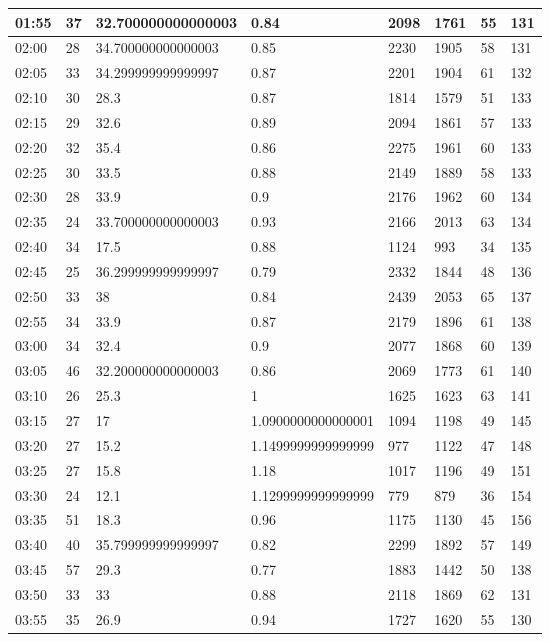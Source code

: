 \documentclass[
]{book}
\begin{document}
\begin{tabular}{l|l|l|l|l|l|l|l}
\hline
01:55 & 37 & 32.700000000000003 & 0.84 & 2098 & 1761 & 55 & 131\\
\hline
02:00 & 28 & 34.700000000000003 & 0.85 & 2230 & 1905 & 58 & 131\\
\hline
02:05 & 33 & 34.299999999999997 & 0.87 & 2201 & 1904 & 61 & 132\\
\hline
02:10 & 30 & 28.3 & 0.87 & 1814 & 1579 & 51 & 133\\
\hline
02:15 & 29 & 32.6 & 0.89 & 2094 & 1861 & 57 & 133\\
\hline
02:20 & 32 & 35.4 & 0.86 & 2275 & 1961 & 60 & 133\\
\hline
02:25 & 30 & 33.5 & 0.88 & 2149 & 1889 & 58 & 133\\
\hline
02:30 & 28 & 33.9 & 0.9 & 2176 & 1962 & 60 & 134\\
\hline
02:35 & 24 & 33.700000000000003 & 0.93 & 2166 & 2013 & 63 & 134\\
\hline
02:40 & 34 & 17.5 & 0.88 & 1124 & 993 & 34 & 135\\
\hline
02:45 & 25 & 36.299999999999997 & 0.79 & 2332 & 1844 & 48 & 136\\
\hline
02:50 & 33 & 38 & 0.84 & 2439 & 2053 & 65 & 137\\
\hline
02:55 & 34 & 33.9 & 0.87 & 2179 & 1896 & 61 & 138\\
\hline
03:00 & 34 & 32.4 & 0.9 & 2077 & 1868 & 60 & 139\\
\hline
03:05 & 46 & 32.200000000000003 & 0.86 & 2069 & 1773 & 61 & 140\\
\hline
03:10 & 26 & 25.3 & 1 & 1625 & 1623 & 63 & 141\\
\hline
03:15 & 27 & 17 & 1.0900000000000001 & 1094 & 1198 & 49 & 145\\
\hline
03:20 & 27 & 15.2 & 1.1499999999999999 & 977 & 1122 & 47 & 148\\
\hline
03:25 & 27 & 15.8 & 1.18 & 1017 & 1196 & 49 & 151\\
\hline
03:30 & 24 & 12.1 & 1.1299999999999999 & 779 & 879 & 36 & 154\\
\hline
03:35 & 51 & 18.3 & 0.96 & 1175 & 1130 & 45 & 156\\
\hline
03:40 & 40 & 35.799999999999997 & 0.82 & 2299 & 1892 & 57 & 149\\
\hline
03:45 & 57 & 29.3 & 0.77 & 1883 & 1442 & 50 & 138\\
\hline
03:50 & 33 & 33 & 0.88 & 2118 & 1869 & 62 & 131\\
\hline
03:55 & 35 & 26.9 & 0.94 & 1727 & 1620 & 55 & 130\\

\end{tabular}
\end{document}
